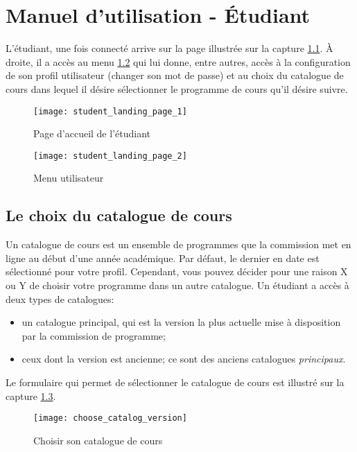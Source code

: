 \chapter{Manuel d'utilisation - Étudiant}
L'étudiant, une fois connecté arrive sur la page illustrée sur la capture \ref{fig:student_landing_page_manual}. À droite, il a accès au menu \ref{fig:user_menu} qui lui donne, entre autres, accès à la configuration de son profil utilisateur (changer son mot de passe) et au choix du catalogue de cours dans lequel il désire sélectionner le programme de cours qu'il désire suivre. 
\begin{figure}[htb]
\centering
\caption{Page d’accueil de l'étudiant}
\label{fig:student_landing_page_manual}
\texttt{[image: student\_landing\_page\_1]}
\end{figure}

\begin{figure}[htb]
\centering
\caption{Menu utilisateur}
\label{fig:user_menu}
\texttt{[image: student\_landing\_page\_2]}
\end{figure}


\section{Le choix du catalogue de cours}
Un catalogue de cours est un ensemble de programmes que la commission met en ligne au début d'une année académique. Par défaut, le dernier en date est sélectionné pour votre profil. Cependant, vous pouvez décider pour une raison X ou Y de choisir votre programme dans un autre catalogue. Un étudiant a accès à deux types de catalogues: 


\begin{itemize}
\item un catalogue principal, qui est la version la plus actuelle mise à disposition par la commission de programme;
\item ceux dont la version est ancienne; ce sont des anciens catalogues \textit{principaux}.
\end{itemize}

Le formulaire qui permet de sélectionner le catalogue de cours est illustré sur la capture \ref{fig:choose_catalog_version}.

\begin{figure}
\centering
\caption{Choisir son catalogue de cours}
\label{fig:choose_catalog_version}
\texttt{[image: choose\_catalog\_version]}
\end{figure}

